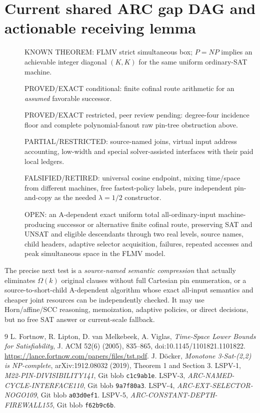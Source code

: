 \documentclass[11pt]{article}
\begin{document}
\section{Current shared ARC gap DAG and actionable receiving lemma}
\begin{description}
\item[] KNOWN THEOREM: FLMV strict simultaneous box; $P=NP$ implies an achievable integer diagonal $(K,K)$ for the same uniform ordinary-SAT machine.
\item[] PROVED/EXACT conditional: finite cofinal route arithmetic for an \emph{assumed} favorable successor.
\item[] PROVED/EXACT restricted, peer review pending: degree-four incidence floor and complete polynomial-fanout raw pin-tree obstruction above.
\item[] PARTIAL/RESTRICTED: source-named joins, virtual input address accounting, low-width and special solver-assisted interfaces with their paid local ledgers.
\item[] FALSIFIED/RETIRED: universal cosine endpoint, mixing time/space from different machines, free fastest-policy labels, pure independent pin-and-copy as the needed $\lambda=1/2$ constructor.
\item[] OPEN: an A-dependent exact uniform total all-ordinary-input machine-producing successor or alternative finite cofinal route, preserving SAT and UNSAT and eligible descendants through two real levels, source names, child headers, adaptive selector acquisition, failures, repeated accesses and peak simultaneous space in the FLMV model.
\end{description}
The precise next test is a \emph{source-named semantic compression} that actually eliminates $\Omega(k)$ original clauses without full Cartesian pin enumeration, or a source-to-short-child A-dependent algorithm whose exact all-input semantics and cheaper joint resources can be independently checked. It may use Horn/affine/SCC reasoning, memoization, adaptive policies, or direct decisions, but no free SAT answer or current-scale fallback.

\begin{thebibliography}{9}
 L. Fortnow, R. Lipton, D. van Melkebeek, A. Viglas, \emph{Time-Space Lower Bounds for Satisfiability}, J. ACM 52(6) (2005), 835--865, doi:10.1145/1101821.1101822. \url{https://lance.fortnow.com/papers/files/tst.pdf}.
 J. D\"ocker, \emph{Monotone 3-Sat-(2,2) is NP-complete}, arXiv:1912.08032 (2019), Theorem 1 and Section 3.
 LSPV-1, \emph{M22-PIN-DIVISIBILITY141}, Git blob \texttt{c1c9ab1e}.
 LSPV-3, \emph{ARC-NAMED-CYCLE-INTERFACE110}, Git blob \texttt{9a7f80a3}.
 LSPV-4, \emph{ARC-EXT-SELECTOR-NOGO109}, Git blob \texttt{a03d0ef1}.
 LSPV-5, \emph{ARC-CONSTANT-DEPTH-FIREWALL155}, Git blob \texttt{f62b9c6b}.
\end{thebibliography}
\end{document}
